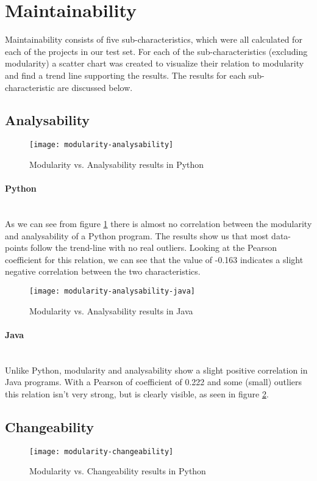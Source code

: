 \documentclass[twoside]{uva-inf-bachelor-thesis}
\newcommand{\myparagraph}[1]{\paragraph{#1}\mbox{}\\}
\begin{document}
\section{Maintainability}
Maintainability consists of five sub-characteristics, which were all calculated for each of the projects in our test set. For each of the sub-characteristics (excluding modularity) a scatter chart was created to visualize their relation to modularity and find a trend line supporting the results. The results for each sub-characteristic are discussed below.

\subsection{Analysability}

\begin{figure}[H]
    \caption{Modularity vs. Analysability results in Python}
    \label{figure:mod-analysis}
    \centering
        \texttt{[image: modularity-analysability]}
\end{figure}

\myparagraph{Python}
As we can see from figure \ref{figure:mod-analysis} there is almost no correlation between the modularity and analysability of a Python program. The results show us that most data-points follow the trend-line with no real outliers. Looking at the Pearson coefficient for this relation, we can see that the value of -0.163 indicates a slight negative correlation between the two characteristics.

\begin{figure}[H]
    \caption{Modularity vs. Analysability results in Java}
    \label{figure:mod-analysis-java}
    \centering
        \texttt{[image: modularity-analysability-java]}
\end{figure}

\myparagraph{Java}
Unlike Python, modularity and analysability show a slight positive correlation in Java programs. With a Pearson of coefficient of 0.222 and some (small) outliers this relation isn't very strong, but is clearly visible, as seen in figure \ref{figure:mod-analysis-java}.

\subsection{Changeability}

\begin{figure}[H]
    \caption{Modularity vs. Changeability results in Python}
    \label{figure:mod-change}
    \centering
        \texttt{[image: modularity-changeability]}
\end{figure}
\end{document}
